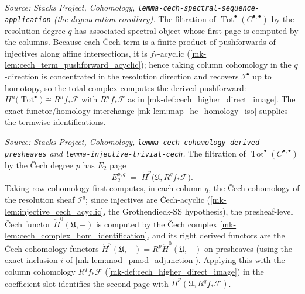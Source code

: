 \begin{lemma}
  \label{mk-lem:total_complex_first_filtration_degenerates}
  \textit{Source: Stacks Project, Cohomology,
  \texttt{lemma-cech-spectral-sequence-application} (the degeneration corollary).}
  The filtration of \(\operatorname{Tot}^\bullet(C^{\bullet,\bullet})\) by the
  resolution degree \(q\) has associated spectral object whose first page is computed
  by the columns. Because each {\v C}ech term is a finite product of pushforwards of
  injectives along affine intersections, it is \(f_*\)-acyclic
  (\ref{mk-lem:cech_term_pushforward_acyclic}); hence taking column cohomology in the
  \(q\)-direction is concentrated in the resolution direction and recovers
  \(\mathcal{I}^\bullet\) up to homotopy, so the total complex computes the derived
  pushforward: \(H^n\bigl(\operatorname{Tot}^\bullet\bigr) \cong R^n f_*\mathcal{F}\)
  with \(R^n f_*\mathcal{F}\) as in \ref{mk-def:cech_higher_direct_image}. The
  exact-functor/homology interchange \ref{mk-lem:map_hc_homology_iso} supplies the
  termwise identifications.
\end{lemma}

\begin{lemma}[Second filtration: \(E_2 = \check{H}^p(\mathfrak{U}, R^q f_*\mathcal{F})\)]
  \label{mk-lem:total_complex_second_filtration_E2}
  \textit{Source: Stacks Project, Cohomology,
  \texttt{lemma-cech-cohomology-derived-presheaves} and
  \texttt{lemma-injective-trivial-cech}.}
  The filtration of \(\operatorname{Tot}^\bullet(C^{\bullet,\bullet})\) by the
  {\v C}ech degree \(p\) has \(E_2\) page
  \[
    E_2^{p,q} \;=\; \check{H}^p\bigl(\mathfrak{U}, R^q f_*\mathcal{F}\bigr).
  \]
  Taking row cohomology first computes, in each column \(q\), the {\v C}ech cohomology
  of the resolution sheaf \(\mathcal{I}^q\); since injectives are {\v C}ech-acyclic
  (\ref{mk-lem:injective_cech_acyclic}, the Grothendieck-SS hypothesis), the
  presheaf-level {\v C}ech functor \(\check{H}^0(\mathfrak{U}, -)\) is computed by the
  {\v C}ech complex \ref{mk-lem:cech_complex_hom_identification}, and its right derived
  functors are the {\v C}ech cohomology functors
  \(\check{H}^p(\mathfrak{U}, -) = R^p\check{H}^0(\mathfrak{U}, -)\) on presheaves
  (using the exact inclusion \(i\) of \ref{mk-lem:mod_pmod_adjunction}). Applying this
  with the column cohomology \(R^q f_*\mathcal{F}\)
  (\ref{mk-def:cech_higher_direct_image}) in the coefficient slot identifies the second
  page with \(\check{H}^p(\mathfrak{U}, R^q f_*\mathcal{F})\).
\end{lemma}

